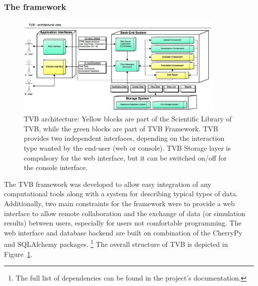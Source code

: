 \subsubsection{The framework}


 \begin{figure}
        \centering
        \includegraphics[width=0.90\textwidth]{images/architecture.jpg}
        \caption{TVB architecture: Yellow blocks are part of the Scientific
            Library of TVB, while the green blocks are part of TVB Framework.
            TVB provides two independent interfaces, depending on the
            interaction type wanted by the end-user (web or console).  TVB
            Storage layer is compulsory for the web interface, but it can be
            switched on/off for the console interface.  
         }
        \label{fig:architecture}
 \end{figure}

The TVB framework was developed to allow easy integration of any
computational tools along with a system for describing typical types of data.
Additionally, 
two main constraints for the framework were to provide a web
interface to allow remote collaboration and the
exchange of data (or simulation results) between users, especially for
users not comfortable programming. The web interface
and database backend are built on combination of 
the \textsf{CherryPy} and \textsf{SQLAlchemy} packages.
\footnote{The full list of dependencies can be found in the
project's documentation.}
The overall structure of TVB is depicted in Figure~\ref{fig:architecture}.


